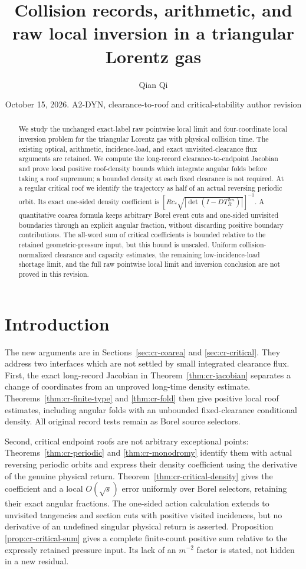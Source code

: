 \documentclass[11pt,reqno]{amsart}
\title[Collision records and raw local inversion]{Collision records, arithmetic, and raw local inversion in a triangular Lorentz gas}
\author{Qian Qi}
\date{October 15, 2026. A2-DYN, clearance-to-roof and critical-stability author revision}
\numberwithin{equation}{section}
\theoremstyle{definition}\newtheorem{definition}[theorem]{Definition}
\theoremstyle{remark}\newtheorem{remark}[theorem]{Remark}
\begin{document}
\raggedbottom
\begin{abstract}
We study the unchanged exact-label raw pointwise local limit and
four-coordinate local inversion problem for the triangular Lorentz
gas with physical collision time. The existing optical, arithmetic,
incidence-load, and exact unvisited-clearance flux arguments are
retained. We compute the long-record clearance-to-endpoint Jacobian
and prove local positive roof-density bounds which integrate angular
folds before taking a roof supremum; a bounded density at each fixed
clearance is not required. At a regular critical roof we identify the
trajectory as half of an actual reversing periodic orbit. Its exact
one-sided density coefficient is
$[Rc_*\sqrt{|\det(I-DT_R^{2m})|}]^{-1}$.
A quantitative coarea formula keeps arbitrary Borel event cuts and
one-sided unvisited boundaries through an explicit angular fraction,
without discarding positive boundary contributions. The all-word sum
of critical coefficients is bounded relative to the retained
geometric-pressure input, but this bound is unscaled. Uniform
collision-normalized clearance and capacity estimates, the remaining
low-incidence-load shortage limit, and the full raw pointwise local
limit and inversion conclusion are not proved in this revision.
\end{abstract}
\maketitle

\section*{Introduction}
The new arguments are in Sections~\ref{sec:cr-coarea} and
\ref{sec:cr-critical}. They address two interfaces which are not
settled by small integrated clearance flux. First, the exact
long-record Jacobian in Theorem~\ref{thm:cr-jacobian} separates a
change of coordinates from an unproved long-time density estimate.
Theorems~\ref{thm:cr-finite-type} and \ref{thm:cr-fold} then give
positive local roof estimates, including angular folds with an
unbounded fixed-clearance conditional density. All original record
tests remain as Borel source selectors.

Second, critical endpoint roofs are not arbitrary exceptional
points: Theorems~\ref{thm:cr-periodic} and
\ref{thm:cr-monodromy} identify them with actual reversing periodic
orbits and express their density coefficient using the derivative
of the genuine physical return. Theorem~\ref{thm:cr-critical-density}
gives the coefficient and a local $O(\sqrt{s})$ error uniformly over
Borel selectors, retaining their exact angular fractions. The
one-sided action calculation extends to unvisited tangencies and
section cuts with positive visited incidences, but no derivative of
an undefined singular physical return is asserted. Proposition~
\ref{prop:cr-critical-sum} gives a complete finite-count positive
sum relative to the expressly retained pressure input. Its lack of
an $m^{-2}$ factor is stated, not hidden in a new residual.
\end{document}
